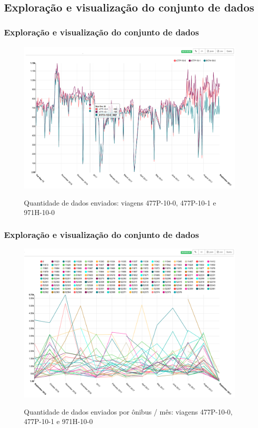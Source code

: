 \documentclass{beamer}
\begin{document}
\subsection{Exploração e visualização do conjunto de dados}
\begin{frame}
\frametitle{Exploração e visualização do conjunto de dados}
\begin{figure}[H]%
	\centering
 	  \caption{Quantidade de dados enviados: viagens 477P-10-0, 477P-10-1 e 971H-10-0}
		\includegraphics[width=0.8\linewidth]{qtd_data_per_day477p971h}
	\label{fig:qtd_data_per_day477p971h}
\end{figure}

\end{frame}
\begin{frame}
\frametitle{Exploração e visualização do conjunto de dados}
\begin{figure}[H]%
	\centering
 	  \caption{Quantidade de dados enviados por ônibus / mês: viagens 477P-10-0, 477P-10-1 e 971H-10-0}
		\includegraphics[width=0.8\linewidth]{qtd_data_per_bus_month_477p971h}
	\label{fig:qtd_data_per_bus_month_477p971h}
\end{figure}

\end{frame}
\end{document}
